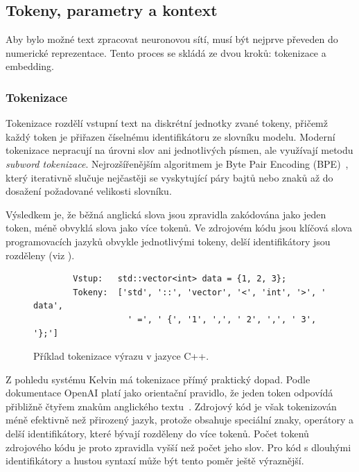 \subsection{Tokeny, parametry a kontext}
\label{subsec:llm-tokens-parameters-context}

Aby bylo možné text zpracovat neuronovou sítí, musí být nejprve převeden do numerické reprezentace.
Tento proces se skládá ze dvou kroků: tokenizace a embedding.

\subsubsection*{Tokenizace}
\label{subsubsec:tokenization}

Tokenizace rozdělí vstupní text na diskrétní jednotky zvané tokeny, přičemž každý token je přiřazen číselnému identifikátoru ze slovníku modelu.
Moderní tokenizace nepracují na úrovni slov ani jednotlivých písmen, ale využívají metodu \textit{subword tokenizace}.
Nejrozšířenějším algoritmem je Byte Pair Encoding (BPE)~\cite{sennrich-bpe}, který iterativně slučuje nejčastěji se vyskytující páry bajtů nebo znaků až do dosažení požadované velikosti slovníku.

Výsledkem je, že běžná anglická slova jsou zpravidla zakódována jako jeden token, méně obvyklá slova jako více tokenů.
Ve zdrojovém kódu jsou klíčová slova programovacích jazyků obvykle jednotlivými tokeny, delší identifikátory jsou rozděleny (viz ).

\begin{figure}[H]
    \centering
    \begin{verbatim}
        Vstup:   std::vector<int> data = {1, 2, 3};
        Tokeny:  ['std', '::', 'vector', '<', 'int', '>', ' data',
                   ' =', ' {', '1', ',', ' 2', ',', ' 3', '};']
    \end{verbatim}
    \caption{Příklad tokenizace výrazu v jazyce C++.}
    \label{fig:tokenization-example}
\end{figure}

Z pohledu systému Kelvin má tokenizace přímý praktický dopad.
Podle dokumentace OpenAI platí jako orientační pravidlo, že jeden token odpovídá přibližně čtyřem znakům anglického textu~\cite{openai-tokenizer}.
Zdrojový kód je však tokenizován méně efektivně než přirozený jazyk, protože obsahuje speciální znaky, operátory a delší identifikátory, které bývají rozděleny do více tokenů.
Počet tokenů zdrojového kódu je proto zpravidla vyšší než počet jeho slov.
Pro kód s dlouhými identifikátory a hustou syntaxí může být tento poměr ještě výraznější.

